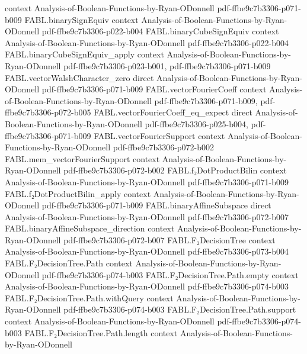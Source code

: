 \begin{theorem}
  {context}
  {Analysis-of-Boolean-Functions-by-Ryan-ODonnell}
  {pdf-ffbe9c7b3306-p071-b009}
\proofstep
  {FABL.binarySignEquiv}
  {context}
  {Analysis-of-Boolean-Functions-by-Ryan-ODonnell}
  {pdf-ffbe9c7b3306-p022-b004}
\proofstep
  {FABL.binaryCubeSignEquiv}
  {context}
  {Analysis-of-Boolean-Functions-by-Ryan-ODonnell}
  {pdf-ffbe9c7b3306-p022-b004}
\proofstep
  {FABL.binaryCubeSignEquiv_apply}
  {context}
  {Analysis-of-Boolean-Functions-by-Ryan-ODonnell}
  {pdf-ffbe9c7b3306-p023-b001,
    pdf-ffbe9c7b3306-p071-b009}
\proofstep
  {FABL.vectorWalshCharacter_zero}
  {direct}
  {Analysis-of-Boolean-Functions-by-Ryan-ODonnell}
  {pdf-ffbe9c7b3306-p071-b009}
\proofstep
  {FABL.vectorFourierCoeff}
  {context}
  {Analysis-of-Boolean-Functions-by-Ryan-ODonnell}
  {pdf-ffbe9c7b3306-p071-b009,
    pdf-ffbe9c7b3306-p072-b005}
\proofstep
  {FABL.vectorFourierCoeff_eq_expect}
  {direct}
  {Analysis-of-Boolean-Functions-by-Ryan-ODonnell}
  {pdf-ffbe9c7b3306-p025-b004,
    pdf-ffbe9c7b3306-p071-b009}
\proofstep
  {FABL.vectorFourierSupport}
  {context}
  {Analysis-of-Boolean-Functions-by-Ryan-ODonnell}
  {pdf-ffbe9c7b3306-p072-b002}
\proofstep
  {FABL.mem_vectorFourierSupport}
  {context}
  {Analysis-of-Boolean-Functions-by-Ryan-ODonnell}
  {pdf-ffbe9c7b3306-p072-b002}
\proofstep
  {FABL.f₂DotProductBilin}
  {context}
  {Analysis-of-Boolean-Functions-by-Ryan-ODonnell}
  {pdf-ffbe9c7b3306-p071-b009}
\proofstep
  {FABL.f₂DotProductBilin_apply}
  {context}
  {Analysis-of-Boolean-Functions-by-Ryan-ODonnell}
  {pdf-ffbe9c7b3306-p071-b009}
\proofstep
  {FABL.binaryAffineSubspace}
  {direct}
  {Analysis-of-Boolean-Functions-by-Ryan-ODonnell}
  {pdf-ffbe9c7b3306-p072-b007}
\proofstep
  {FABL.binaryAffineSubspace_direction}
  {context}
  {Analysis-of-Boolean-Functions-by-Ryan-ODonnell}
  {pdf-ffbe9c7b3306-p072-b007}
\proofstep
  {FABL.F₂DecisionTree}
  {context}
  {Analysis-of-Boolean-Functions-by-Ryan-ODonnell}
  {pdf-ffbe9c7b3306-p073-b004}
\proofstep
  {FABL.F₂DecisionTree.Path}
  {context}
  {Analysis-of-Boolean-Functions-by-Ryan-ODonnell}
  {pdf-ffbe9c7b3306-p074-b003}
\proofstep
  {FABL.F₂DecisionTree.Path.empty}
  {context}
  {Analysis-of-Boolean-Functions-by-Ryan-ODonnell}
  {pdf-ffbe9c7b3306-p074-b003}
\proofstep
  {FABL.F₂DecisionTree.Path.withQuery}
  {context}
  {Analysis-of-Boolean-Functions-by-Ryan-ODonnell}
  {pdf-ffbe9c7b3306-p074-b003}
\proofstep
  {FABL.F₂DecisionTree.Path.support}
  {context}
  {Analysis-of-Boolean-Functions-by-Ryan-ODonnell}
  {pdf-ffbe9c7b3306-p074-b003}
\proofstep
  {FABL.F₂DecisionTree.Path.length}
  {context}
  {Analysis-of-Boolean-Functions-by-Ryan-ODonnell}

\end{theorem}
